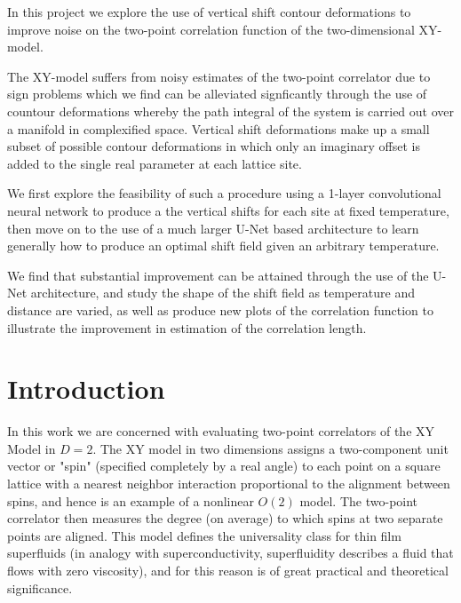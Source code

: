 \documentclass[12pt]{article}
\begin{document}
In this project we explore the use of vertical shift contour deformations to improve noise on the two-point correlation function of the
two-dimensional XY-model.

The XY-model suffers from noisy estimates of the two-point correlator due to sign problems which we find can be alleviated signficantly through
the use of countour deformations whereby the path integral of the system is carried out over a manifold in complexified space. Vertical shift deformations
make up a small subset of possible contour deformations in which only an imaginary offset is added to the single real parameter at each lattice site.

We first explore the feasibility of such a procedure using a 1-layer convolutional neural network to produce a the vertical shifts for each site at fixed temperature,
then move on to the use of a much larger U-Net based architecture to learn generally how to produce an optimal shift field given an arbitrary temperature.

We find that substantial improvement can be attained through the use of the U-Net architecture, and study the shape of the shift field as temperature and
distance are varied, as well as produce new plots of the correlation function to illustrate the improvement in estimation of the correlation length.


\newpage

\tableofcontents

\newpage

\listoffigures
\listoftables

\newpage

\section{Introduction}

In this work we are concerned with evaluating two-point correlators of the XY Model in $D=2$. The XY model in two dimensions assigns a two-component unit vector or "spin"
(specified completely by a real angle) to each point on a square lattice with a nearest neighbor interaction proportional to the alignment between spins, and hence is an example of a 
nonlinear $O(2)$ model. The two-point correlator then measures the degree (on average) to which spins at two separate points are aligned.
This model defines the universality class for thin film superfluids (in analogy with superconductivity, superfluidity describes a fluid that flows with zero viscosity), 
and for this reason is of great practical and theoretical significance.
\end{document}
